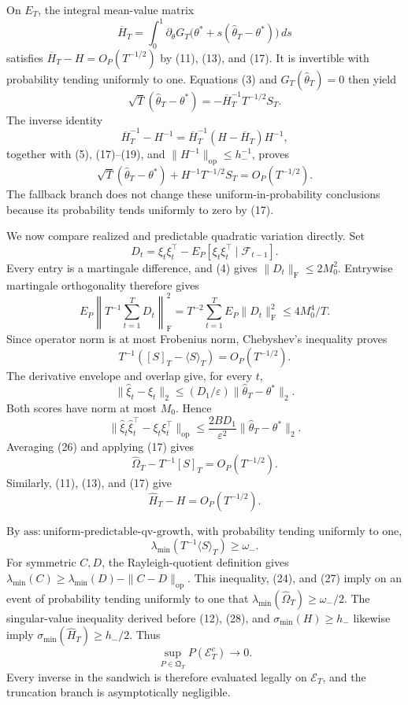 On \(E_T\), the integral mean-value matrix
\[
 \overline H_T=\int_0^1\partial_\theta G_T
 \bigl(\theta^*+s(\widehat\theta_T-\theta^*)\bigr)\,ds
\tag{18}
\]
satisfies \(\overline H_T-H=O_P(T^{-1/2})\) by (11), (13), and (17). It is invertible with probability tending uniformly to one. Equations (3) and \(G_T(\widehat\theta_T)=0\) then yield
\[
 \sqrt T(\widehat\theta_T-\theta^*)
 =-\overline H_T^{-1}T^{-1/2}S_T.
\tag{19}
\]
The inverse identity
\[
 \overline H_T^{-1}-H^{-1}
 =\overline H_T^{-1}(H-\overline H_T)H^{-1},
\tag{20}
\]
together with (5), (17)--(19), and \(\|H^{-1}\|_{\mathrm{op}}\le h_-^{-1}\), proves
\[
 \sqrt T(\widehat\theta_T-\theta^*)+H^{-1}T^{-1/2}S_T
 =O_P(T^{-1/2}).
\tag{21}
\]
The fallback branch does not change these uniform-in-probability conclusions because its probability tends uniformly to zero by (17).

We now compare realized and predictable quadratic variation directly. Set
\[
 D_t=\xi_t\xi_t^\top-E_P[\xi_t\xi_t^\top\mid\mathcal F_{t-1}].
\tag{22}
\]
Every entry is a martingale difference, and (4) gives \(\|D_t\|_{\mathrm F}\le2M_0^2\). Entrywise martingale orthogonality therefore gives
\[
 E_P\left\|T^{-1}\sum_{t=1}^TD_t\right\|_{\mathrm F}^2
 =T^{-2}\sum_{t=1}^TE_P\|D_t\|_{\mathrm F}^2
 \le4M_0^4/T.
\tag{23}
\]
Since operator norm is at most Frobenius norm, Chebyshev's inequality proves
\[
 T^{-1}([S]_T-\langle S\rangle_T)=O_P(T^{-1/2}).
\tag{24}
\]
The derivative envelope and overlap give, for every \(t\),
\[
 \|\widehat\xi_t-\xi_t\|_2
 \le(D_1/\varepsilon)\|\widehat\theta_T-\theta^*\|_2.
\tag{25}
\]
Both scores have norm at most \(M_0\). Hence
\[
 \|\widehat\xi_t\widehat\xi_t^\top-\xi_t\xi_t^\top\|_{\mathrm{op}}
 \le \frac{2BD_1}{\varepsilon^2}\|\widehat\theta_T-\theta^*\|_2.
\tag{26}
\]
Averaging (26) and applying (17) gives
\[
 \widehat\Omega_T-T^{-1}[S]_T=O_P(T^{-1/2}).
\tag{27}
\]
Similarly, (11), (13), and (17) give
\[
 \widehat H_T-H=O_P(T^{-1/2}).
\tag{28}
\]

By \(\mathrm{ass:uniform\text{-}predictable\text{-}qv\text{-}growth}\), with probability tending uniformly to one,
\[
 \lambda_{\min}(T^{-1}\langle S\rangle_T)\ge\omega_-.
\tag{29}
\]
For symmetric \(C,D\), the Rayleigh-quotient definition gives \(\lambda_{\min}(C)\ge\lambda_{\min}(D)-\|C-D\|_{\mathrm{op}}\). This inequality, (24), and (27) imply on an event of probability tending uniformly to one that \(\lambda_{\min}(\widehat\Omega_T)\ge\omega_-/2\). The singular-value inequality derived before (12), (28), and \(\sigma_{\min}(H)\ge h_-\) likewise imply \(\sigma_{\min}(\widehat H_T)\ge h_-/2\). Thus
\[
 \sup_{P\in\mathfrak Q_T}P(\mathcal E_T^c)\longrightarrow0.
\tag{30}
\]
Every inverse in the sandwich is therefore evaluated legally on \(\mathcal E_T\), and the truncation branch is asymptotically negligible.

